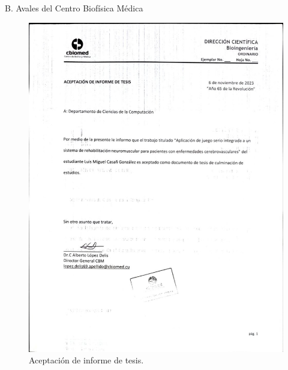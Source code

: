 \begin{annexes}{B. Avales del Centro Biofísica Médica}
    \begin{figure}[!ht]
        \centering
        \includegraphics[scale=0.3]{images/annexes/aval-cbm.jpg}
        \caption{Aceptación de informe de tesis.}
        \label{annex: endorsedby}
    \end{figure}


\end{annexes}
